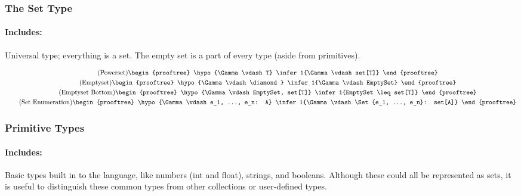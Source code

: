 \subsubsection{The Set Type}
\paragraph{Includes:} Universal type; everything is a set. The empty set is a part of every type (aside from primitives).

\begin{gather}
\tag{Powerset}
\begin{prooftree}
\hypo{\Gamma \vdash T}
\infer1{\Gamma \vdash set[T]}
\end{prooftree}
\\
\tag{Emptyset}
\begin{prooftree}
\hypo{\Gamma \vdash \diamond}
\infer1{\Gamma \vdash EmptySet}
\end{prooftree}
\\
\tag{Emptyset Bottom}
\begin{prooftree}
\hypo{\Gamma \vdash EmptySet, set[T]}
\infer1{EmptySet \leq set[T]}
\end{prooftree}
\\
\tag{Set Enumeration}
\begin{prooftree}
\hypo{\Gamma \vdash e_1, ..., e_n: A}
\infer1{\Gamma \vdash \Set{e_1, ..., e_n}: set[A]}
\end{prooftree}
\end{gather}

\subsubsection{Primitive Types}
\paragraph{Includes:} Basic types built in to the language, like numbers (int and float), strings, and booleans. Although these could all be represented as sets, it is useful to distinguish these common types from other collections or user-defined types.

